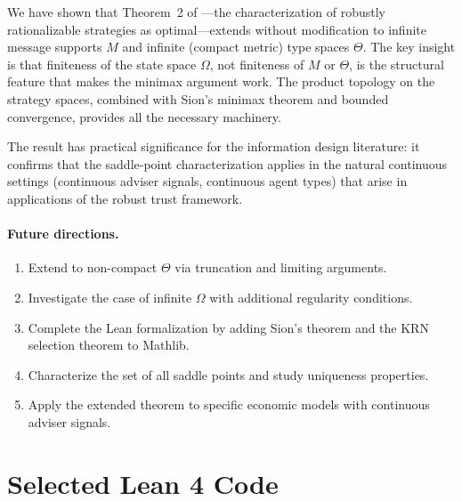 \documentclass[11pt,a4paper]{article}
\theoremstyle{definition}
\begin{document}
We have shown that Theorem~2 of \citet{dworczak2026robust}---the characterization of robustly rationalizable strategies as optimal---extends without modification to infinite message supports $M$ and infinite (compact metric) type spaces $\Theta$.
The key insight is that finiteness of the state space $\Omega$, not finiteness of $M$ or $\Theta$, is the structural feature that makes the minimax argument work.
The product topology on the strategy spaces, combined with Sion's minimax theorem and bounded convergence, provides all the necessary machinery.

The result has practical significance for the information design literature: it confirms that the saddle-point characterization applies in the natural continuous settings (continuous adviser signals, continuous agent types) that arise in applications of the robust trust framework.

\paragraph{Future directions.}
\begin{enumerate}[leftmargin=*]
  \item Extend to non-compact $\Theta$ via truncation and limiting arguments.
  \item Investigate the case of infinite $\Omega$ with additional regularity conditions.
  \item Complete the Lean formalization by adding Sion's theorem and the KRN selection theorem to Mathlib.
  \item Characterize the set of all saddle points and study uniqueness properties.
  \item Apply the extended theorem to specific economic models with continuous adviser signals.
\end{enumerate}




\appendix

\section{Selected Lean 4 Code}
\label{app:lean}
\end{document}

